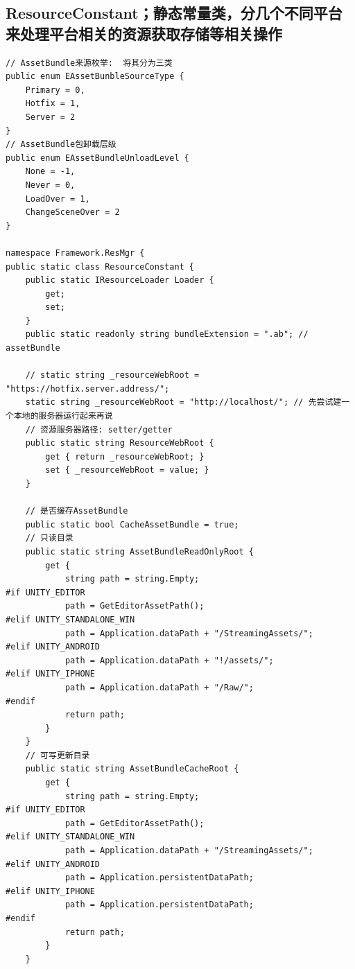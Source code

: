 \documentclass[9pt, b5paper]{article}
\begin{document}
\subsection{ResourceConstant；静态常量类，分几个不同平台来处理平台相关的资源获取存储等相关操作}
\label{sec-7-4}
\begin{verbatim}
// AssetBundle来源枚举:  将其分为三类
public enum EAssetBunbleSourceType {
    Primary = 0,
    Hotfix = 1,
    Server = 2
}
// AssetBundle包卸载层级
public enum EAssetBundleUnloadLevel {
    None = -1,
    Never = 0,
    LoadOver = 1,
    ChangeSceneOver = 2
}

namespace Framework.ResMgr {
public static class ResourceConstant {
    public static IResourceLoader Loader {
        get;
        set;
    }
    public static readonly string bundleExtension = ".ab"; // assetBundle

    // static string _resourceWebRoot = "https://hotfix.server.address/"; 
    static string _resourceWebRoot = "http://localhost/"; // 先尝试建一个本地的服务器运行起来再说
    // 资源服务器路径: setter/getter
    public static string ResourceWebRoot {
        get { return _resourceWebRoot; }
        set { _resourceWebRoot = value; }
    }

    // 是否缓存AssetBundle
    public static bool CacheAssetBundle = true;
    // 只读目录
    public static string AssetBundleReadOnlyRoot {
        get {
            string path = string.Empty;
#if UNITY_EDITOR
            path = GetEditorAssetPath();
#elif UNITY_STANDALONE_WIN
            path = Application.dataPath + "/StreamingAssets/";
#elif UNITY_ANDROID
            path = Application.dataPath + "!/assets/";
#elif UNITY_IPHONE
            path = Application.dataPath + "/Raw/";
#endif
            return path;
        }
    }
    // 可写更新目录
    public static string AssetBundleCacheRoot {
        get {
            string path = string.Empty;
#if UNITY_EDITOR
            path = GetEditorAssetPath();
#elif UNITY_STANDALONE_WIN
            path = Application.dataPath + "/StreamingAssets/";
#elif UNITY_ANDROID
            path = Application.persistentDataPath;
#elif UNITY_IPHONE
            path = Application.persistentDataPath;
#endif
            return path;
        }
    }


\end{verbatim}
\end{document}
